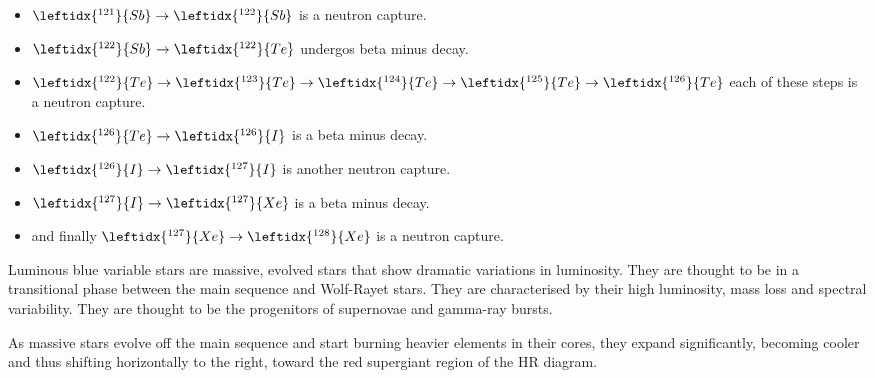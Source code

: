 \documentclass{tufte-handout}
\begin{document}
\begin{question}
\vspace{2cm}

\begin{itemize}
    \item \( \leftidx{^{121}}{Sb} \rightarrow \leftidx{^{122}}{Sb} \) is a neutron capture.\\
    \item \( \leftidx{^{122}}{Sb} \rightarrow \leftidx{^{122}}{Te} \) undergos beta minus decay.\\
    \item \( \leftidx{^{122}}{Te} \rightarrow \leftidx{^{123}}{Te} \rightarrow \leftidx{^{124}}{Te} \rightarrow \leftidx{^{125}}{Te} 
    \rightarrow \leftidx{^{126}}{Te}\) each of these steps is a neutron capture.\\
    \item \( \leftidx{^{126}}{Te} \rightarrow \leftidx{^{126}}{I} \) is a beta minus decay.\\
    \item \( \leftidx{^{126}}{I} \rightarrow \leftidx{^{127}}{I} \) is another neutron capture.\\
    \item \( \leftidx{^{127}}{I} \rightarrow \leftidx{^{127}}{Xe} \) is a beta minus decay.\\
    \item and finally \( \leftidx{^{127}}{Xe} \rightarrow \leftidx{^{128}}{Xe} \) is a neutron capture.\\
\end{itemize}

\clearpage

\qpart

\qsubpart
Luminous blue variable stars are massive, evolved stars that show dramatic variations in luminosity. 
They are thought to be in a transitional phase between the main sequence and Wolf-Rayet stars. 
They are characterised by their high luminosity, mass loss and spectral variability. 
They are thought to be the progenitors of supernovae and gamma-ray bursts.

\vspace{2cm}

\qsubpart

As massive stars evolve off the main sequence and start burning heavier elements in their cores, they expand significantly, 
becoming cooler and thus shifting horizontally to the right, toward the red supergiant region of the HR diagram.

\vspace{2cm}


\end{question}
\end{document}
